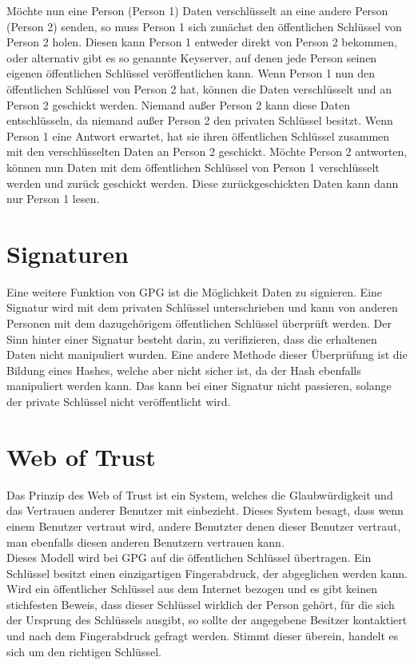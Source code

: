 \documentclass[12pt,a4paper]{scrreprt}
\begin{document}
\noindent Möchte nun eine Person (Person 1) Daten verschlüsselt an eine andere Person (Person 2) senden, so muss Person 1 sich zunächst den öffentlichen Schlüssel von Person 2 holen. Diesen kann Person 1 entweder direkt von Person 2 bekommen, oder alternativ gibt es so genannte Keyserver, auf denen jede Person seinen eigenen öffentlichen Schlüssel veröffentlichen kann. Wenn Person 1 nun den öffentlichen Schlüssel von Person 2 hat, können die Daten verschlüsselt und an Person 2 geschickt werden. Niemand außer Person 2 kann diese Daten entschlüsseln, da niemand außer Person 2 den privaten Schlüssel besitzt. Wenn Person 1 eine Antwort erwartet, hat sie ihren öffentlichen Schlüssel zusammen mit den verschlüsselten Daten an Person 2 geschickt. Möchte Person 2 antworten, können nun Daten mit dem öffentlichen Schlüssel von Person 1 verschlüsselt werden und zurück geschickt werden. Diese zurückgeschickten Daten kann dann nur Person 1 lesen.

\section{Signaturen}
Eine weitere Funktion von GPG ist die Möglichkeit Daten zu signieren. Eine Signatur wird mit dem privaten Schlüssel unterschrieben und kann von anderen Personen mit dem dazugehörigem öffentlichen Schlüssel überprüft werden. Der Sinn hinter einer Signatur besteht darin, zu verifizieren, dass die erhaltenen Daten nicht manipuliert wurden. Eine andere Methode dieser Überprüfung ist die Bildung eines Hashes, welche aber nicht sicher ist, da der Hash ebenfalls manipuliert werden kann. Das kann bei einer Signatur nicht passieren, solange der private Schlüssel nicht veröffentlicht wird.

\newpage

\section{Web of Trust}
Das Prinzip des Web of Trust ist ein System, welches die Glaubwürdigkeit und das Vertrauen anderer Benutzer mit einbezieht. Dieses System besagt, dass wenn einem Benutzer vertraut wird, andere Benutzter denen dieser Benutzer vertraut, man ebenfalls diesen anderen Benutzern vertrauen kann.\\

\noindent Dieses Modell wird bei GPG auf die öffentlichen Schlüssel übertragen. Ein Schlüssel besitzt einen einzigartigen Fingerabdruck, der abgeglichen werden kann. Wird ein öffentlicher Schlüssel aus dem Internet bezogen und es gibt keinen stichfesten Beweis, dass dieser Schlüssel wirklich der Person gehört, für die sich der Ursprung des Schlüssels ausgibt, so sollte der angegebene Besitzer kontaktiert und nach dem Fingerabdruck gefragt werden. Stimmt dieser überein, handelt es sich um den richtigen Schlüssel.
\end{document}
